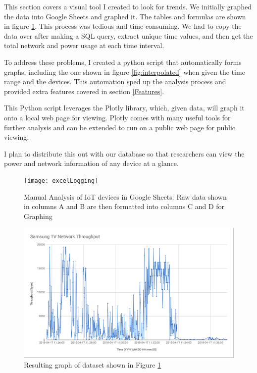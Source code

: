 This section covers a visual tool I created to look for trends. We initially graphed the data into Google Sheets and graphed it. The tables and formulas are shown in figure \ref{fig:excelLogging}. This process was tedious and time-consuming. We had to copy the data over after making a SQL query, extract unique time values, and then get the total network and power usage at each time interval.

To address these problems, I created a python script that automatically forms graphs, including the one shown in figure \ref{fig:interpolated} when given the time range and the devices. This automation sped up the analysis process and provided extra features covered in section \ref{Features}.

This Python script leverages the Plotly library, which, given data, will graph it onto a local web page for viewing. Plotly comes with many useful tools for further analysis and can be extended to run on a public web page for public viewing.

I plan to distribute this out with our database so that researchers can view the power and network information of any device at a glance.

\begin{figure}[H]
    \centering
    \texttt{[image: excelLogging]}
    \caption{Manual Analysis of IoT devices in Google Sheets: Raw data shown in columns A and B are then formatted into columns C and D for Graphing}
    \label{fig:excelLogging}
\end{figure}

\begin{figure}[H]
    \centering
    \includegraphics[width=1\textwidth]{figures/tvThroughput.png}
    \caption{Resulting graph of dataset shown in Figure \ref{fig:excelLogging}}
    \label{fig:tvThroughput}
\end{figure}

